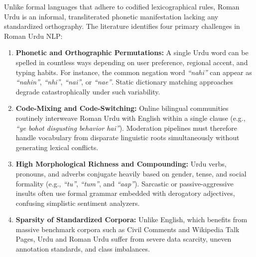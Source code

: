 \documentclass[A4paper,12pt]{report}
\theoremstyle{plain}
\theoremstyle{definition}
\theoremstyle{remark}
\numberwithin{equation}{section}
\begin{document}
Unlike formal languages that adhere to codified lexicographical rules, Roman Urdu is an informal, transliterated phonetic manifestation lacking any standardized orthography. The literature identifies four primary challenges in Roman Urdu NLP:
\begin{enumerate}[leftmargin=*]
    \item \textbf{Phonetic and Orthographic Permutations:} A single Urdu word can be spelled in countless ways depending on user preference, regional accent, and typing habits. For instance, the common negation word \textit{``nahi''} can appear as \textit{``nahin''}, \textit{``nhi''}, \textit{``nai''}, or \textit{``nae''}. Static dictionary matching approaches degrade catastrophically under such variability.
    \item \textbf{Code-Mixing and Code-Switching:} Online bilingual communities routinely interweave Roman Urdu with English within a single clause (e.g., \textit{``ye bohot disgusting behavior hai''}). Moderation pipelines must therefore handle vocabulary from disparate linguistic roots simultaneously without generating lexical conflicts.
    \item \textbf{High Morphological Richness and Compounding:} Urdu verbs, pronouns, and adverbs conjugate heavily based on gender, tense, and social formality (e.g., \textit{``tu''}, \textit{``tum''}, and \textit{``aap''}). Sarcastic or passive-aggressive insults often use formal grammar embedded with derogatory adjectives, confusing simplistic sentiment analyzers.
    \item \textbf{Sparsity of Standardized Corpora:} Unlike English, which benefits from massive benchmark corpora such as Civil Comments and Wikipedia Talk Pages, Urdu and Roman Urdu suffer from severe data scarcity, uneven annotation standards, and class imbalances.
\end{enumerate}
\end{document}
